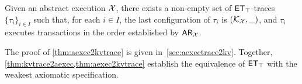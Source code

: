 

\begin{theorem}
\label{thm:aexec2kvtrace}
Given an abstract execution $\mathcal{X}$, there exists a non-empty 
set of $\mathsf{ET}_{\top}$-traces $\{\tau_{i}\}_{i \in I}$ such that, for each $i \in I$, the last configuration of $\tau_{i}$ is 
$(\mathcal{K}_{\mathcal{X}}, \_)$, and $\tau_{i}$ executes transactions in the order established by $\mathsf{AR}_{\mathcal{X}}$. 
\end{theorem}
\noindent The proof of \cref{thm:aexec2kvtrace} is given 
in~\cref{sec:aexectrace2kv}. Together, \cref{thm:kvtrace2aexec,thm:aexec2kvtrace} establish the
equivalence  of $\mathsf{ET}_{\top}$ with the weakest axiomatic specification. 


